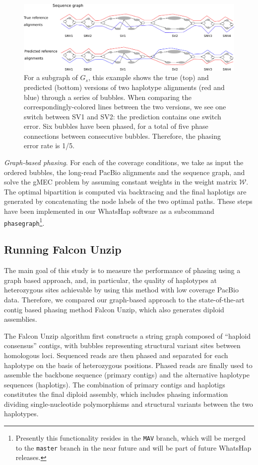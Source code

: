 \begin{figure}[t!]\centering
\includegraphics[width=\columnwidth]{evaluation.pdf}
\caption{For a subgraph of $G_s$, this example shows the true (top) and predicted (bottom) versions of two haplotype alignments (red and blue) through a series of bubbles. When comparing the correspondingly-colored lines between the two versions, we see one switch between SV1 and SV2: the prediction contains one switch error. 
Six bubbles have been phased, for a total of five phase connections between consecutive bubbles. Therefore, the phasing error rate is 1/5.}
\label{fig:evaluation}
\end{figure}
\textit{Graph-based phasing}. For each of the coverage conditions, we take as input the ordered bubbles, the long-read PacBio alignments and the sequence graph, and solve the gMEC problem by assuming constant weights in the weight matrix $\mathcal{W}$.
The optimal bipartition is computed via backtracing and the final haplotigs are generated by concatenating the node labels of the two optimal paths.
These steps have been implemented in our WhatsHap software as a subcommand \texttt{phasegraph}\footnote{Presently this functionality resides in the \texttt{MAV} branch, which will be merged to the \texttt{master} branch in the near future and will be part of future WhatsHap releases.}.
\subsection{Running Falcon Unzip}
The main goal of this study is to measure the performance of phasing using a graph based approach, 
and, in particular, the quality of haplotypes at heterozygous sites achievable by using this method with low coverage PacBio data.
Therefore, we compared our graph-based approach to the state-of-the-art contig based phasing method Falcon Unzip, which also generates diploid assemblies.

The Falcon Unzip \citep{chin2016phased} algorithm first constructs a string graph composed of ``haploid consensus'' contigs, with bubbles representing structural variant sites between homologous loci. 
Sequenced reads are then phased and separated for each haplotype on the basis of heterozygous positions. 
Phased reads are finally used to assemble the backbone sequence (primary contigs) and the alternative haplotype sequences (haplotigs). 
The combination of primary contigs and haplotigs constitutes the final diploid assembly, which includes phasing information dividing single-nucleotide polymorphisms and structural variants between the two haplotypes.

